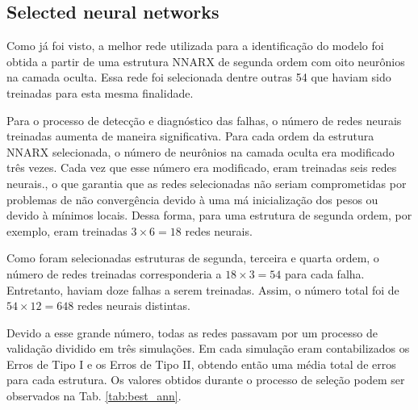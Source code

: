 \documentclass[10pt,fleqn,a4paper]{article}
\begin{document}
\subsection{Selected neural networks}
Como já foi visto, a melhor rede utilizada para a identificação do modelo foi
obtida a partir de uma estrutura NNARX de segunda ordem com oito neurônios na
camada oculta. Essa rede foi selecionada dentre outras 54 que haviam sido
treinadas para esta mesma finalidade.

Para o processo de detecção e diagnóstico das falhas, o número de redes neurais
treinadas aumenta de maneira significativa. Para cada ordem da estrutura NNARX
selecionada, o número de neurônios na camada oculta era modificado três vezes.
Cada vez que esse número era modificado, eram treinadas seis redes neurais., o
que garantia que as redes selecionadas não seriam comprometidas por problemas de
não convergência devido à uma má inicialização dos pesos ou devido à mínimos
locais. Dessa forma, para uma estrutura de segunda ordem, por exemplo, eram
treinadas $3 \times 6 = 18$ redes neurais.  

Como foram selecionadas estruturas de segunda, terceira e quarta ordem, o número
de redes treinadas corresponderia a $18 \times 3 = 54$ para cada falha.
Entretanto, haviam doze falhas a serem treinadas. Assim, o número total foi de
$54 \times 12 = 648$ redes neurais distintas.

Devido a esse grande número, todas as redes passavam por um processo de
validação dividido em três simulações. Em cada simulação eram contabilizados os
Erros de Tipo I e os Erros de Tipo II, obtendo então uma média total de erros
para cada estrutura. Os valores obtidos durante o processo de seleção podem ser
observados na Tab. \ref{tab:best_ann}.
\end{document}
